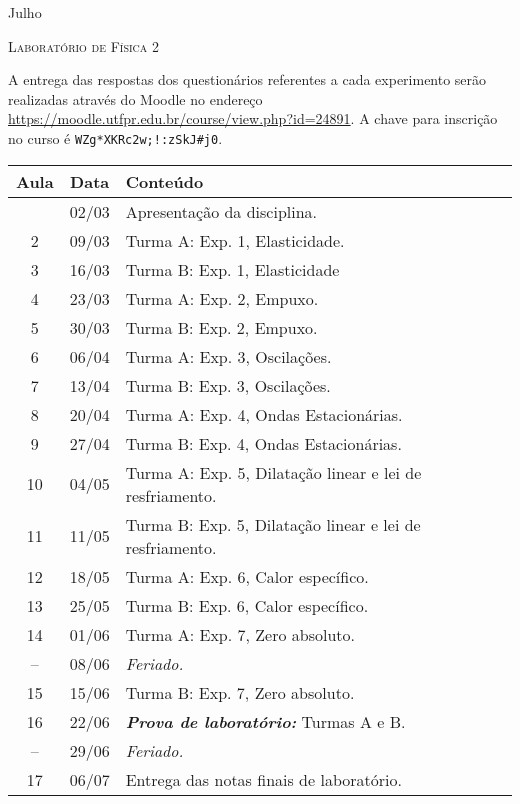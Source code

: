 %
\begin{marginfigure}
    \centering
    Julho\\
\end{marginfigure}
\vspace{1cm}
\begin{center}
\Large\textsc{Laboratório de Física 2}
\end{center}

A entrega das respostas dos questionários referentes a cada experimento serão realizadas através do Moodle no endereço \url{https://moodle.utfpr.edu.br/course/view.php?id=24891}. A chave para inscrição no curso é \verb|WZg*XKRc2w;!:zSkJ#j0|.
\begin{center}
\begin{longtable}{ccp{70mm}}
\toprule
Aula & Data & Conteúdo \\
\midrule
\endhead
\bottomrule
\endfoot
 1 & 02/03 & Apresentação da disciplina. \\
 2 & 09/03 & Turma A: Exp. 1, Elasticidade. \\
 3 & 16/03 & Turma B: Exp. 1, Elasticidade \\
 4 & 23/03 & Turma A: Exp. 2, Empuxo. \\ 
 5 & 30/03 & Turma B: Exp. 2, Empuxo. \\
 6 & 06/04 & Turma A: Exp. 3, Oscilações. \\
 7 & 13/04 & Turma B: Exp. 3, Oscilações. \\
 8 & 20/04 & Turma A: Exp. 4, Ondas Estacionárias. \\
 9 & 27/04 & Turma B: Exp. 4, Ondas Estacionárias. \\
10 & 04/05 & Turma A: Exp. 5, Dilatação linear e lei de resfriamento. \\
11 & 11/05 & Turma B: Exp. 5, Dilatação linear e lei de resfriamento. \\
12 & 18/05 & Turma A: Exp. 6, Calor específico. \\
13 & 25/05 & Turma B: Exp. 6, Calor específico. \\
14 & 01/06 & Turma A: Exp. 7, Zero absoluto. \\
-- & 08/06 & \emph{Feriado.} \\
15 & 15/06 & Turma B: Exp. 7, Zero absoluto. \\
16 & 22/06 & \textbf{\textit{Prova de laboratório:}} Turmas A e B. \\
-- & 29/06 & \emph{Feriado.} \\
17 & 06/07 & Entrega das notas finais de laboratório. \\
\end{longtable}
\end{center}

\cleardoublepage
